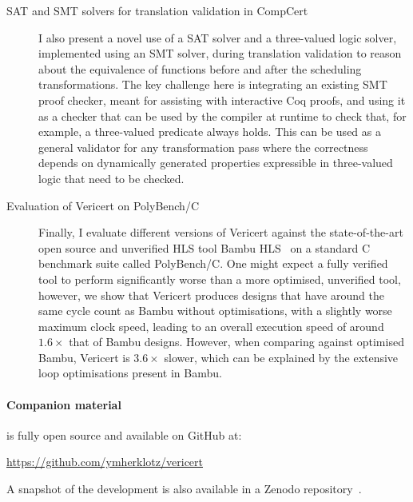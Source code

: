 \begin{description}
\item[SAT and SMT solvers for translation validation in CompCert] I also present
  a novel use of a \gls{SAT} solver and a three-valued logic solver, implemented
  using an \gls{SMT} solver, during translation validation to reason about the
  equivalence of functions before and after the scheduling transformations.  The
  key challenge here is integrating an existing \gls{SMT} proof checker, meant
  for assisting with interactive Coq proofs, and using it as a checker that can
  be used by the compiler at runtime to check that, for example, a three-valued
  predicate always holds.  This can be used as a general validator for any
  transformation pass where the correctness depends on dynamically generated
  properties expressible in three-valued logic that need to be checked.


\item[Evaluation of Vericert on PolyBench/C] Finally, I evaluate different
  versions of Vericert against the state-of-the-art open source and unverified
  \gls{HLS} tool Bambu HLS~\cite{pilato13_bambu} on a standard C benchmark suite
  called PolyBench/C.  One might expect a fully verified tool to perform
  significantly worse than a more optimised, unverified tool, however, we show
  that Vericert produces designs that have around the same cycle count as Bambu
  without optimisations, with a slightly worse maximum clock speed, leading to
  an overall execution speed of around $1.6\times$ that of Bambu designs.
  However, when comparing against optimised Bambu, Vericert is $3.6\times$
  slower, which can be explained by the extensive loop optimisations present in
  Bambu.
\end{description}

\paragraph{Companion material}
\vericert{} is fully open source and available on GitHub at:

\begin{center}
  \url{https://github.com/ymherklotz/vericert}
\end{center}

A snapshot of the \vericert{} development is also available in a Zenodo
repository~\cite{herklotz24_v}.

